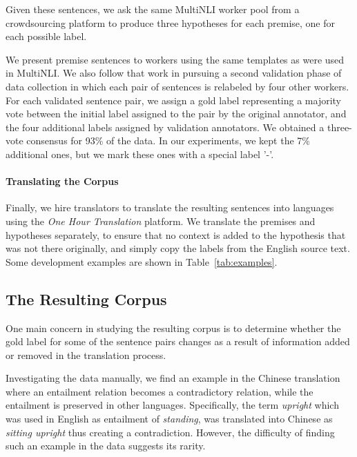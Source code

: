 \documentclass[11pt,a4paper]{article}
\begin{document}
Given these sentences, we ask the same MultiNLI worker pool from a crowdsourcing platform to produce three hypotheses for each premise, one for each possible label.

We present premise sentences to workers using the same templates as were used in MultiNLI. We also follow that work in pursuing a second validation phase of data collection in which each pair of sentences is relabeled by four other workers. For each validated sentence pair, we assign a gold label representing a majority vote between the initial label assigned to the pair by the original
annotator, and the four additional labels assigned
by validation annotators. We obtained a three-vote consensus for 93\% of the data. In our experiments, we kept the 7\% additional ones, but we mark these ones with a special label '-'. 

\insertstats

\paragraph{Translating the Corpus}

Finally, we hire translators to translate the resulting sentences into \nlangs languages using the {\it One Hour Translation} platform. We translate the premises and hypotheses separately, to ensure that no context is added to the hypothesis that was not there originally, and simply copy the labels from the English source text. Some development examples are shown in Table~\ref{tab:examples}. 

\subsection{The Resulting Corpus}
\label{sec:analysis}

One main concern in studying the resulting corpus is to determine whether the gold label for some of the sentence pairs changes as a result of information added or removed in the translation process. 

Investigating the data manually, we find an example in the Chinese translation where an entailment relation becomes a contradictory relation, while the entailment is preserved in other languages. Specifically, the term {\it upright} which was used in English as entailment of {\it standing}, was translated into Chinese as {\it sitting upright} thus creating a contradiction. However, the difficulty of finding such an example in the data suggests its rarity. 
\end{document}
